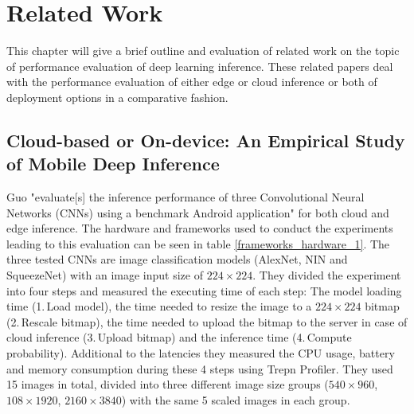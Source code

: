 \chapter{Related Work}
\label{chap:relatedWork}
This chapter will give a brief outline and evaluation of related work on the topic of performance evaluation of deep learning inference. These related papers deal with the performance evaluation of either edge or cloud inference or both of deployment options in a comparative fashion.



\section{Cloud-based or On-device:
An Empirical Study of Mobile Deep Inference}
Guo "evaluate[s] the inference performance of three Convolutional Neural Networks
(CNNs) using a benchmark Android application" \cite{DBLP:conf/ic2e/Guo18} for both cloud and edge inference. The hardware and frameworks used to conduct the experiments leading to this evaluation can be seen in table \ref{frameworks_hardware_1}. The three tested CNNs are image classification models (AlexNet, NIN and SqueezeNet) with an image input size of $224\times224$.
They divided the experiment into four steps and measured the executing time of each step: 
The model loading time (1.\,Load model), the time needed to resize the image to a $224\times224$ bitmap (2.\,Rescale bitmap), the time needed to upload the bitmap to the server in case of cloud inference (3.\,Upload bitmap) and the inference time (4.\,Compute probability).
Additional to the latencies they measured the CPU usage, battery and memory consumption during these 4 steps using Trepn Profiler.
They used 15 images in total, divided into three different image size groups ($540\times960$, $108\times1920$, $2160\times3840$) with the same 5 scaled images in each group.

